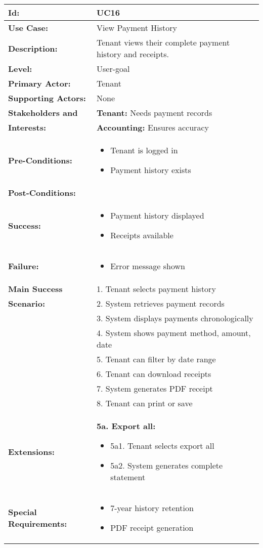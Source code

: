 \documentclass[12pt]{article}
\begin{document}
\begin{longtable}{|p{3cm}|p{11cm}|}
\hline
\textbf{Id:} & UC16 \\
\hline
\textbf{Use Case:} & View Payment History \\
\hline
\textbf{Description:} & Tenant views their complete payment history and receipts. \\
\hline
\textbf{Level:} & User-goal \\
\hline
\textbf{Primary Actor:} & Tenant \\
\hline
\textbf{Supporting Actors:} & None \\
\hline
\textbf{Stakeholders and} & \textbf{Tenant:} Needs payment records \\
\textbf{Interests:} & \textbf{Accounting:} Ensures accuracy \\
\hline
\textbf{Pre-Conditions:} & 
\begin{itemize}
    \item Tenant is logged in
    \item Payment history exists
\end{itemize} \\
\hline
\textbf{Post-Conditions:} & \\
\textbf{Success:} & 
\begin{itemize}
    \item Payment history displayed
    \item Receipts available
\end{itemize} \\
\textbf{Failure:} & 
\begin{itemize}
    \item Error message shown
\end{itemize} \\
\hline
\textbf{Main Success} & 1. Tenant selects payment history \\
\textbf{Scenario:} & 2. System retrieves payment records \\
& 3. System displays payments chronologically \\
& 4. System shows payment method, amount, date \\
& 5. Tenant can filter by date range \\
& 6. Tenant can download receipts \\
& 7. System generates PDF receipt \\
& 8. Tenant can print or save \\
\hline
\textbf{Extensions:} & 
\textbf{5a. Export all:}
\begin{itemize}
    \item 5a1. Tenant selects export all
    \item 5a2. System generates complete statement
\end{itemize} \\
\hline
\textbf{Special Requirements:} & 
\begin{itemize}
    \item 7-year history retention
    \item PDF receipt generation
\end{itemize} \\
\hline
\end{longtable}
\end{document}
